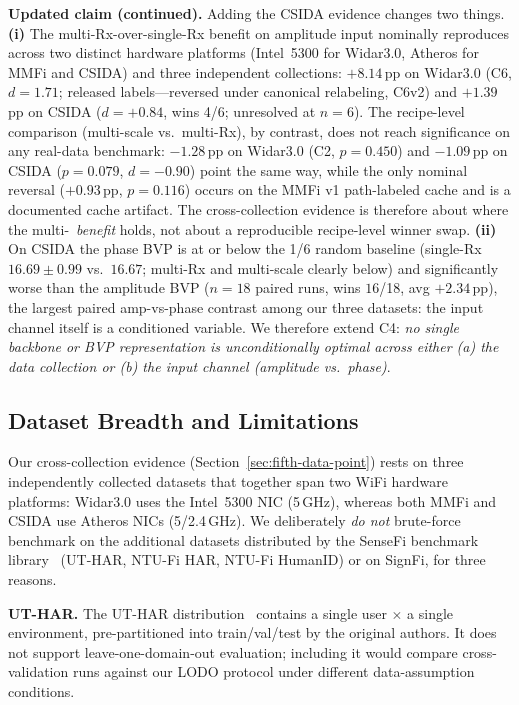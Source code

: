 \documentclass[11pt]{article}
\theoremstyle{definition}
\newcommand{\Rx}{\text{Rx}}
\begin{document}
\textbf{Updated claim (continued).} Adding the CSIDA evidence changes two things. \textbf{(i)} The multi-Rx-over-single-Rx benefit on amplitude input nominally reproduces across two distinct hardware platforms (Intel~5300 for Widar3.0, Atheros for MMFi and CSIDA) and three independent collections: $+8.14$\,pp on Widar3.0 (C6, $d = 1.71$; released labels---reversed under canonical relabeling, C6v2) and $+1.39$\,pp on CSIDA ($d = +0.84$, wins 4/6; unresolved at $n = 6$). The recipe-level comparison (multi-scale vs.\ multi-Rx), by contrast, does not reach significance on any real-data benchmark: $-1.28$\,pp on Widar3.0 (C2, $p = 0.450$) and $-1.09$\,pp on CSIDA ($p = 0.079$, $d = -0.90$) point the same way, while the only nominal reversal ($+0.93$\,pp, $p = 0.116$) occurs on the MMFi v1 path-labeled cache and is a documented cache artifact. The cross-collection evidence is therefore about where the multi-\Rx\ \emph{benefit} holds, not about a reproducible recipe-level winner swap. \textbf{(ii)} On CSIDA the phase BVP is at or below the 1/6 random baseline (single-Rx $16.69 \pm 0.99$ vs.\ $16.67$; multi-Rx and multi-scale clearly below) and significantly worse than the amplitude BVP ($n{=}18$ paired runs, wins $16$/18, avg $+2.34$\,pp), the largest paired amp-vs-phase contrast among our three datasets: the input channel itself is a conditioned variable. We therefore extend C4: \emph{no single backbone or BVP representation is unconditionally optimal across either (a) the data collection or (b) the input channel (amplitude vs.\ phase)}.

\subsection{Dataset Breadth and Limitations}
\label{sec:dataset-breadth}

Our cross-collection evidence (Section~\ref{sec:fifth-data-point}) rests on three independently collected datasets that together span two WiFi hardware platforms: Widar3.0 uses the Intel~5300 NIC (5\,GHz), whereas both MMFi and CSIDA use Atheros NICs (5/2.4\,GHz). We deliberately \emph{do not} brute-force benchmark on the additional datasets distributed by the SenseFi benchmark library~\cite{yang2023sensefi} (UT-HAR, NTU-Fi HAR, NTU-Fi HumanID) or on SignFi, for three reasons.

\textbf{UT-HAR.} The UT-HAR distribution~\cite{yousefi2017survey} contains a single user $\times$ a single environment, pre-partitioned into train/val/test by the original authors. It does not support leave-one-domain-out evaluation; including it would compare cross-validation runs against our LODO protocol under different data-assumption conditions.
\end{document}
